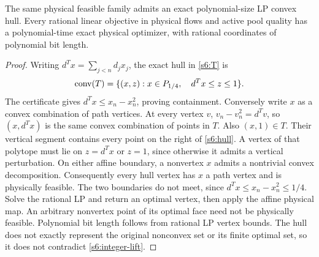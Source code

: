 \begin{theorem}\label{s6:lp-hull}
The same physical feasible family admits an exact polynomial-size LP
convex hull. Every rational linear objective in physical flows and active
pool quality has a polynomial-time exact physical optimizer, with rational
coordinates of polynomial bit length.
\end{theorem}
\begin{proof}
Writing $d^Tx=\sum_{j<n}d_jx_j$, the exact hull in \eqref{s6:T} is
\begin{equation}
 \operatorname{conv}(T)=\{(x,z):x\in P_{1/4},\quad d^Tx\le z\le1\}.
 \label{s6:hull}
\end{equation}
The certificate gives $d^Tx\le x_n-x_n^2$, proving containment.
Conversely write $x$ as a convex combination of path vertices.
At every vertex $v$, $v_n-v_n^2=d^Tv$, so $(x,d^Tx)$ is the same
convex combination of points in $T$. Also $(x,1)\in T$. Their vertical
segment contains every point on the right of \eqref{s6:hull}.
A vertex of that polytope must lie on $z=d^Tx$ or $z=1$, since otherwise
it admits a vertical perturbation. On either affine boundary, a nonvertex
$x$ admits a nontrivial convex decomposition. Consequently every hull
vertex has $x$ a path vertex and is physically feasible. The two
boundaries do not meet, since $d^Tx\le x_n-x_n^2\le1/4$.
Solve the rational LP and return an optimal vertex, then apply the affine
physical map. An arbitrary nonvertex point of its optimal face need not
be physically feasible. Polynomial bit length follows from rational LP
vertex bounds. The hull does not exactly represent the original
nonconvex set or its finite optimal set, so it does not contradict
\cref{s6:integer-lift}.
\end{proof}

